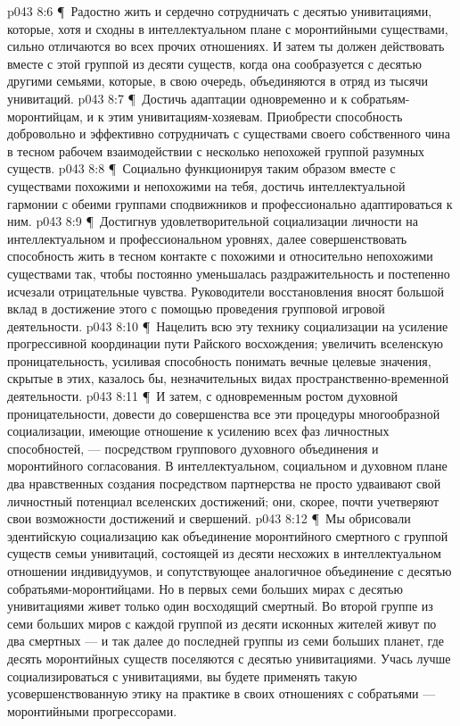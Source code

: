 \vs p043 8:6 \P\ \bibnobreakspace Радостно жить и сердечно сотрудничать с десятью унивитациями, которые, хотя и сходны в интеллектуальном плане с моронтийными существами, сильно отличаются во всех прочих отношениях. И затем ты должен действовать вместе с этой группой из десяти существ, когда она сообразуется с десятью другими семьями, которые, в свою очередь, объединяются в отряд из тысячи унивитаций.
\vs p043 8:7 \P\ \bibnobreakspace Достичь адаптации одновременно и к собратьям\hyp{}моронтийцам, и к этим унивитациям\hyp{}хозяевам. Приобрести способность добровольно и эффективно сотрудничать с существами своего собственного чина в тесном рабочем взаимодействии с несколько непохожей группой разумных существ.
\vs p043 8:8 \P\ \bibnobreakspace Социально функционируя таким образом вместе с существами похожими и непохожими на тебя, достичь интеллектуальной гармонии с обеими группами сподвижников и профессионально адаптироваться к ним.
\vs p043 8:9 \P\ \bibnobreakspace Достигнув удовлетворительной социализации личности на интеллектуальном и профессиональном уровнях, далее совершенствовать способность жить в тесном контакте с похожими и относительно непохожими существами так, чтобы постоянно уменьшалась раздражительность и постепенно исчезали отрицательные чувства. Руководители восстановления вносят большой вклад в достижение этого с помощью проведения групповой игровой деятельности.
\vs p043 8:10 \P\ \bibnobreakspace Нацелить всю эту технику социализации на усиление прогрессивной координации пути Райского восхождения; увеличить вселенскую проницательность, усиливая способность понимать вечные целевые значения, скрытые в этих, казалось бы, незначительных видах пространственно\hyp{}временной деятельности.
\vs p043 8:11 \P\ \bibnobreakspace И затем, с одновременным ростом духовной проницательности, довести до совершенства все эти процедуры многообразной социализации, имеющие отношение к усилению всех фаз личностных способностей, --- посредством группового духовного объединения и моронтийного согласования. В интеллектуальном, социальном и духовном плане два нравственных создания посредством партнерства не просто удваивают свой личностный потенциал вселенских достижений; они, скорее, почти учетверяют свои возможности достижений и свершений.
\vs p043 8:12 \P\ Мы обрисовали эдентийскую социализацию как объединение моронтийного смертного с группой существ семьи унивитаций, состоящей из десяти несхожих в интеллектуальном отношении индивидуумов, и сопутствующее аналогичное объединение с десятью собратьями\hyp{}моронтийцами. Но в первых семи больших мирах с десятью унивитациями живет только один восходящий смертный. Во второй группе из семи больших миров с каждой группой из десяти исконных жителей живут по два смертных --- и так далее до последней группы из семи больших планет, где десять моронтийных существ поселяются с десятью унивитациями. Учась лучше социализироваться с унивитациями, вы будете применять такую усовершенствованную этику на практике в своих отношениях с собратьями --- моронтийными прогрессорами.
